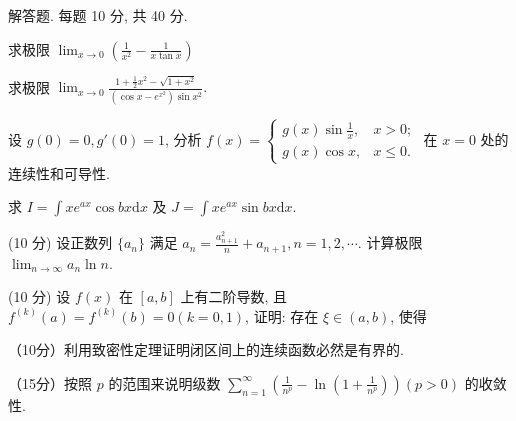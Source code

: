 \par{}
解答题. 每题 10 分, 共 40 分.\par
求极限 $\lim_{x\to 0}\left(\frac{1}{x^2} -\frac{1}{x\tan x}\right)$\par
求极限 $\lim_{x\to 0}\frac{1 + \frac{1}{2}x^2 - \sqrt{1 + x^2}}{(\cos x - e^{x^2})\sin x^2}.$\par
设 $g(0) = 0, g'(0) = 1$, 分析 $f(x) = \begin{cases} g(x) \sin \frac{1}{x}, & x > 0; \\ g(x) \cos x, & x \leq 0. \end{cases}$ 在 $x = 0$ 处的连续性和可导性.\par
求 $I = \int xe^{ax}\cos bx\mathrm{d}x$ 及 $J = \int xe^{ax}\sin bx\mathrm{d}x.$\par
\par{}
(10 分) 设正数列 $\{a_{n}\}$ 满足 $a_{n} = \frac{a_{n+1}^{2}}{n} + a_{n+1}, n = 1,2,\cdots$. 计算极限 $\lim_{n\to \infty}a_n\ln n$.\par
\par{}
\par{}
(10 分) 设 $f(x)$ 在 $[a, b]$ 上有二阶导数, 且 $f^{(k)}(a) = f^{(k)}(b) = 0 (k = 0, 1)$, 证明: 存在 $\xi \in (a, b)$, 使得\par
\nopagebreak[4]
\par{}
（10分）利用致密性定理证明闭区间上的连续函数必然是有界的.\par
\par{}
（15分）按照 $p$ 的范围来说明级数 $\sum_{n=1}^{\infty}\left(\frac{1}{n^p}-\ln\left(1+\frac{1}{n^p}\right)\right)(p>0)$ 的收敛性.\par
